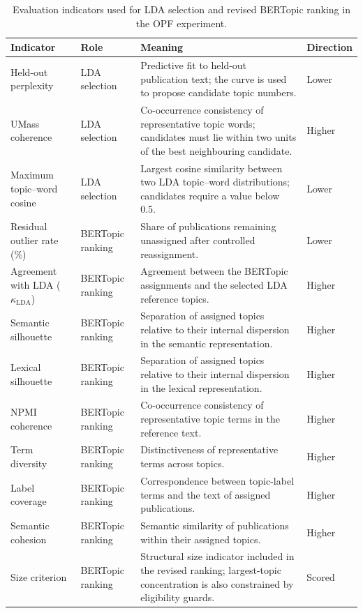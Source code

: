 \documentclass[a4paper,fleqn]{cas-sc}
\begin{document}
\begin{table}[htbp]
\centering
\caption{Evaluation indicators used for LDA selection and revised BERTopic ranking in the OPF experiment.}
\label{tab:opf_evaluation_metrics}
\scriptsize
\setlength{\tabcolsep}{3pt}
\renewcommand{\arraystretch}{1.15}
\begin{tabularx}{\textwidth}{p{30mm}p{25mm}X p{16mm}}
\toprule
Indicator & Role & Meaning & Direction \\
\midrule
Held-out perplexity & LDA selection & Predictive fit to held-out publication text; the curve is used to propose candidate topic numbers. & Lower \\
UMass coherence & LDA selection & Co-occurrence consistency of representative topic words; candidates must lie within two units of the best neighbouring candidate. & Higher \\
Maximum topic--word cosine & LDA selection & Largest cosine similarity between two LDA topic--word distributions; candidates require a value below 0.5. & Lower \\
\midrule
Residual outlier rate (\%) & BERTopic ranking & Share of publications remaining unassigned after controlled reassignment. & Lower \\
Agreement with LDA ($\kappa_{\mathrm{LDA}}$) & BERTopic ranking & Agreement between the BERTopic assignments and the selected LDA reference topics. & Higher \\
Semantic silhouette & BERTopic ranking & Separation of assigned topics relative to their internal dispersion in the semantic representation. & Higher \\
Lexical silhouette & BERTopic ranking & Separation of assigned topics relative to their internal dispersion in the lexical representation. & Higher \\
NPMI coherence & BERTopic ranking & Co-occurrence consistency of representative topic terms in the reference text. & Higher \\
Term diversity & BERTopic ranking & Distinctiveness of representative terms across topics. & Higher \\
Label coverage & BERTopic ranking & Correspondence between topic-label terms and the text of assigned publications. & Higher \\
Semantic cohesion & BERTopic ranking & Semantic similarity of publications within their assigned topics. & Higher \\
Size criterion & BERTopic ranking & Structural size indicator included in the revised ranking; largest-topic concentration is also constrained by eligibility guards. & Scored \\

\end{tabularx}
\end{table}
\end{document}
